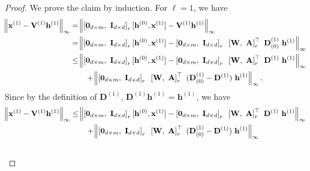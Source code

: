 \begin{proof}
	We prove the claim by induction. For $\ell = 1$, we have 
	\begin{align*}
		\norm{ \mathbf{x}^{(1)} - \mathbf{V}^{(1)}  \mathbf{h}^{(1)}}_\infty &= \norm{ \left[\mathbf{0}_{d \times m}, \text{ } \mathbf{I}_{d \times d}\right]_r [\mathbf{h}^{(0)}, \mathbf{x}^{(1)}] - \mathbf{V}^{(1)}  \mathbf{h}^{(1)}}_\infty  
		\\& = \norm{ \left[\mathbf{0}_{d \times m}, \text{ } \mathbf{I}_{d \times d}\right]_r [\mathbf{h}^{(0)}, \mathbf{x}^{(1)}] -  \left[\mathbf{0}_{d \times m}, \text{ } \mathbf{I}_{d \times d}\right]_r  \text{ } \left[\mathbf{W}, \text{ } \mathbf{A}\right]_r^{\top} \text{ } \mathbf{D}^{(1)}_{(0)} \text{ } \mathbf{h}^{(1)}}_\infty
		\\& \leq \norm{ \left[\mathbf{0}_{d \times m}, \text{ } \mathbf{I}_{d \times d}\right]_r [\mathbf{h}^{(0)}, \mathbf{x}^{(1)}] -  \left[\mathbf{0}_{d \times m}, \text{ } \mathbf{I}_{d \times d}\right]_r  \text{ } \left[\mathbf{W}, \text{ } \mathbf{A}\right]_r^{\top} \text{ } \mathbf{D}^{(1)} \text{ } \mathbf{h}^{(1)} }_\infty \\&
		\quad \quad  + \norm{\left[\mathbf{0}_{d \times m}, \text{ } \mathbf{I}_{d \times d}\right]_r  \text{ } \left[\mathbf{W}, \text{ } \mathbf{A}\right]_r^{\top} \text{ } (\mathbf{D}^{(1)}_{(0)} - \mathbf{D}^{(1)}) \text{ } \mathbf{h}^{(1)}}_\infty.
	\end{align*}
	Since by the definition of $\mathbf{D}^{(1)}$, $\mathbf{D}^{(1)} \mathbf{h}^{(1)} = \mathbf{h}^{(1)}$, we have
	\begin{align}
		\norm{ \mathbf{x}^{(1)} - \bV^{(1)}  \mathbf{h}^{(1)}}_\infty &\leq \norm{ \left[\mathbf{0}_{d \times m}, \text{ } \mathbf{I}_{d \times d}\right]_r [\mathbf{h}^{(0)}, \mathbf{x}^{(1)}] -  \left[\mathbf{0}_{d \times m}, \text{ } \mathbf{I}_{d \times d}\right]_r  \text{ } \left[\mathbf{W}, \text{ } \mathbf{A}\right]_r^{\top} \text{ } \mathbf{D}^{(1)} \text{ } \mathbf{h}^{(1)} }_\infty \nonumber\\&
		\quad \quad  + \norm{\left[\mathbf{0}_{d \times m}, \text{ } \mathbf{I}_{d \times d}\right]_r  \text{ } \left[\mathbf{W}, \text{ } \mathbf{A}\right]_r^{\top} \text{ } (\mathbf{D}^{(1)}_{(0)} - \mathbf{D}^{(1)}) \text{ } \mathbf{h}^{(1)}}_\infty \nonumber\\&

\end{align}
\end{proof}
